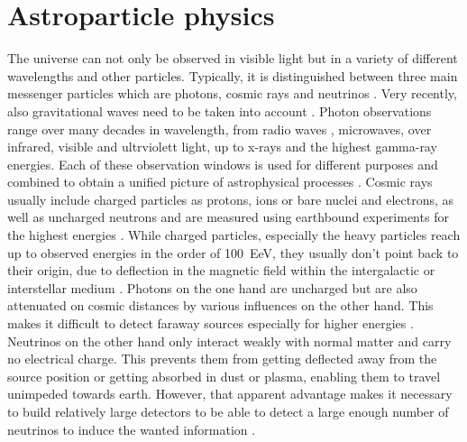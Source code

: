 \chapter{Astroparticle physics}

The universe can not only be observed in visible light but in a variety of different wavelengths and other particles.
Typically, it is distinguished between three main messenger particles which are photons, cosmic rays and neutrinos .
Very recently, also gravitational waves need to be taken into account .
Photon observations range over many decades in wavelength, from radio waves , microwaves, over infrared, visible and ultrviolett light, up to x-rays and the highest gamma-ray energies.
Each of these observation windows is used for different purposes and combined to obtain a unified picture of astrophysical processes .
Cosmic rays usually include charged particles as protons, ions or bare nuclei and electrons, as well as uncharged neutrons and are measured using earthbound experiments for the highest energies .
While charged particles, especially the heavy particles reach up to observed energies in the order of \SI{100}{\exa\eV}, they usually don't point back to their origin, due to deflection in the magnetic field within the intergalactic or interstellar medium .
Photons on the one hand are uncharged but are also attenuated on cosmic distances by various influences on the other hand.
This makes it difficult to detect faraway sources especially for higher energies .
Neutrinos on the other hand only interact weakly with normal matter and carry no electrical charge.
This prevents them from getting deflected away from the source position or getting absorbed in dust or plasma, enabling them to travel unimpeded towards earth.
However, that apparent advantage makes it necessary to build relatively large detectors to be able to detect a large enough number of neutrinos to induce the wanted information .

